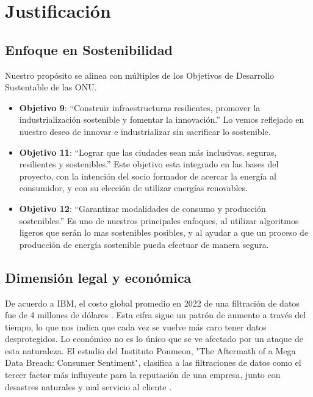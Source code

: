 \documentclass{article}
\begin{document}
    \section{Justificación}

        \subsection{Enfoque en Sostenibilidad}

            Nuestro propósito se alinea con múltiples de los Objetivos de Desarrollo Sustentable de las ONU.
            \begin{itemize}
                \item \textbf{Objetivo 9}: \enquote{Construir infraestructuras resilientes, promover la industrialización sostenible y fomentar la innovación.}  \cite{obj9} Lo vemos reflejado en nuestro deseo de innovar e industrializar sin sacrificar lo sostenible.
                \item \textbf{Objetivo 11}: \enquote{Lograr que las ciudades sean más inclusivas, seguras, resilientes y sostenibles.} \cite{obj11} Este objetivo esta integrado en las bases del proyecto, con la intención del socio formador de acercar la energía al consumidor, y con su elección de utilizar energías renovables.
                \item \textbf{Objetivo 12}: \enquote{Garantizar modalidades de consumo y producción sostenibles.}\cite{obj12} Es uno de nuestros principales enfoques, al utilizar algoritmos ligeros que serán lo mas sostenibles posibles, y al ayudar a que un proceso de producción de energía sostenible pueda efectuar de manera segura.
            \end{itemize}

        \subsection{Dimensión legal y económica}

            De acuerdo a IBM, el costo global promedio en 2022 de una filtración de datos fue de 4 millones de dólares \cite{cost_DB}. Esta cifra sigue un patrón de aumento a través del tiempo, lo que nos indica que cada vez se vuelve más caro tener datos desprotegidos. Lo económico no es lo único que se ve afectado por un ataque de esta naturaleza. El estudio del Instituto Ponmeon, "The Aftermath of a Mega Data Breach: Consumer Sentiment", clasifica a las filtraciones de datos como el tercer factor más influyente para la reputación de una empresa, junto con desastres naturales y mal servicio al cliente \cite{ponmeon}.
\end{document}
